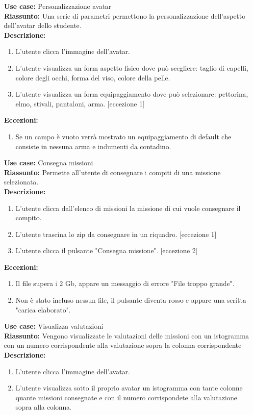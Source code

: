 \textbf{Use case:} Personalizzazione avatar\\
\textbf{Riassunto:} Una serie di parametri permettono la personalizzazione dell'aspetto dell'avatar dello studente.\\
\textbf{Descrizione:} \begin{enumerate}
  \item L'utente clicca l'immagine dell'avatar.

  \item L'utente visualizza un form aspetto fisico dove può scegliere: taglio di capelli, colore degli occhi, forma del viso, colore della pelle.

  \item L'utente visualizza un form equipaggiamento dove può selezionare: pettorina, elmo, stivali, pantaloni, arma. [eccezione 1]
\end{enumerate}
\textbf{Eccezioni: }\begin{enumerate}
  \item Se un campo è vuoto verrà mostrato un equipaggiamento di default che consiste in nessuna arma e indumenti da contadino.
\end{enumerate}

\textbf{Use case:} Consegna missioni\\
\textbf{Riassunto:} Permette all'utente di consegnare i compiti di una missione selezionata.\\
\textbf{Descrizione:} \begin{enumerate}
  \item L'utente clicca dall'elenco di missioni la missione di cui vuole consegnare il compito.

  \item L'utente trascina lo zip da consegnare in un riquadro. [eccezione 1]

  \item L'utente clicca il pulsante "Consegna missione". [eccezione 2]
\end{enumerate}
\textbf{Eccezioni: }\begin{enumerate}
  \item Il file supera i 2 Gb, appare un messaggio di errore "File troppo grande".
  \item Non è stato incluso nessun file, il pulsante diventa rosso e appare una scritta "carica elaborato".
\end{enumerate}

\textbf{Use case:} Visualizza valutazioni\\
\textbf{Riassunto:} Vengono visualizzate le valutazioni delle missioni con un istogramma con un numero corrispondente alla valutazione sopra la colonna corrispondente\\
\textbf{Descrizione:} \begin{enumerate}
  \item L'utente clicca l'immagine dell'avatar.

  \item L'utente visualizza sotto il proprio avatar un istogramma con tante colonne quante missioni consegnate e con il numero corrispondete alla valutazione sopra alla colonna.
\end{enumerate}


